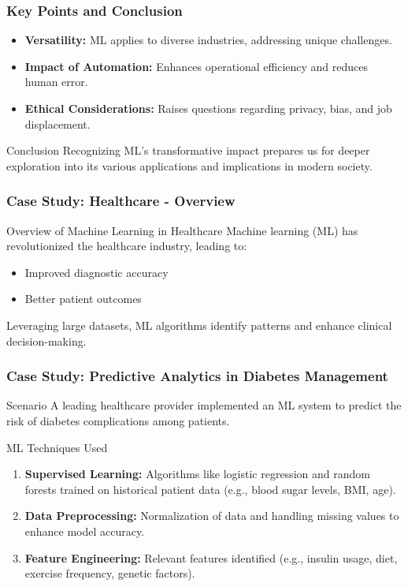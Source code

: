 \documentclass[aspectratio=169]{beamer}
\begin{document}
\begin{frame}[fragile]
    \frametitle{Key Points and Conclusion}
    \begin{itemize}
        \item \textbf{Versatility:} ML applies to diverse industries, addressing unique challenges.
        \item \textbf{Impact of Automation:} Enhances operational efficiency and reduces human error.
        \item \textbf{Ethical Considerations:} Raises questions regarding privacy, bias, and job displacement.
    \end{itemize}
    \begin{block}{Conclusion}
        Recognizing ML's transformative impact prepares us for deeper exploration into its various applications and implications in modern society.
    \end{block}
\end{frame}

\begin{frame}[fragile]
    \frametitle{Case Study: Healthcare - Overview}
    \begin{block}{Overview of Machine Learning in Healthcare}
        Machine learning (ML) has revolutionized the healthcare industry, leading to:
        \begin{itemize}
            \item Improved diagnostic accuracy
            \item Better patient outcomes
        \end{itemize}
        Leveraging large datasets, ML algorithms identify patterns and enhance clinical decision-making.
    \end{block}
\end{frame}

\begin{frame}[fragile]
    \frametitle{Case Study: Predictive Analytics in Diabetes Management}
    \begin{block}{Scenario}
        A leading healthcare provider implemented an ML system to predict the risk of diabetes complications among patients.
    \end{block}
    
    \begin{block}{ML Techniques Used}
        \begin{enumerate}
            \item \textbf{Supervised Learning:} Algorithms like logistic regression and random forests trained on historical patient data (e.g., blood sugar levels, BMI, age).
            \item \textbf{Data Preprocessing:} Normalization of data and handling missing values to enhance model accuracy.
            \item \textbf{Feature Engineering:} Relevant features identified (e.g., insulin usage, diet, exercise frequency, genetic factors).
        \end{enumerate}
    \end{block}
\end{frame}
\end{document}
